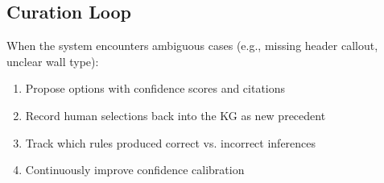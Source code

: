 \subsection{Curation Loop}

When the system encounters ambiguous cases (e.g., missing header callout, unclear wall type):
\begin{enumerate}
  \item Propose options with confidence scores and citations
  \item Record human selections back into the KG as new precedent
  \item Track which rules produced correct vs. incorrect inferences
  \item Continuously improve confidence calibration
\end{enumerate}
